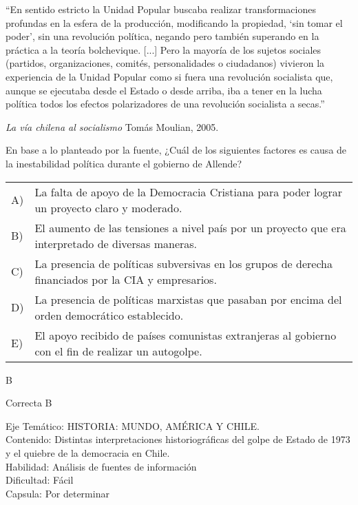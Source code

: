 \documentclass[letterpaper,11pt]{article}
\newcommand{\anchopregunta}{0.9\textwidth}
\begin{document}
\begin{enumerate}
\begin{minipage}{\anchopregunta}
\item ``En sentido estricto la Unidad Popular buscaba realizar transformaciones profundas en la esfera de la producción, modificando la propiedad, ‘sin tomar el poder’, sin una revolución política, negando pero también superando en la práctica a la teoría bolchevique. [...] Pero la mayoría de los sujetos sociales (partidos, organizaciones, comités, personalidades o ciudadanos) vivieron la experiencia de la Unidad Popular como si fuera una revolución socialista que, aunque se ejecutaba desde el Estado o desde arriba, iba a tener en la lucha política todos los efectos polarizadores de una revolución socialista a secas.''
\begin{flushright}
\textit{La vía chilena al socialismo} Tomás Moulian, 2005.
\end{flushright}
En base a lo planteado por la fuente, ¿Cuál de los siguientes factores es causa de la inestabilidad política durante el gobierno de Allende?
\begin{flushleft}\begin{tabular}{@{\hspace{-.001\textwidth}}l@{\hspace{2pt}}p{}}
A)& La falta de apoyo de la Democracia Cristiana para poder lograr un proyecto claro y moderado.\\
B)& El aumento de las tensiones a nivel país por un proyecto que era interpretado de diversas maneras.\\
C)& La presencia de políticas subversivas en los grupos de derecha financiados por la CIA y empresarios.\\
D)& La presencia de políticas marxistas que pasaban por encima del orden democrático establecido.\\
E)& El apoyo recibido de países comunistas extranjeras al gobierno con el fin de realizar un autogolpe. \\ 
\end{tabular}\end{flushleft}%
\begin{key} B
\end{key} 
\begin{hint}
\end{hint}
\begin{answer} Correcta B\\
\end{answer}
\begin{info} %
\begin{flushleft}
Eje Temático: HISTORIA: MUNDO, AMÉRICA Y CHILE.\\
Contenido: Distintas interpretaciones historiográficas del golpe de Estado de 1973 y  el quiebre de la democracia en Chile.\\
Habilidad: Análisis de fuentes de información\\
Dificultad: Fácil\\
Capsula: Por determinar \\
\end{flushleft} 
\end{info}
\end{minipage}\vfill$\;$ %


\end{enumerate}
\end{document}
